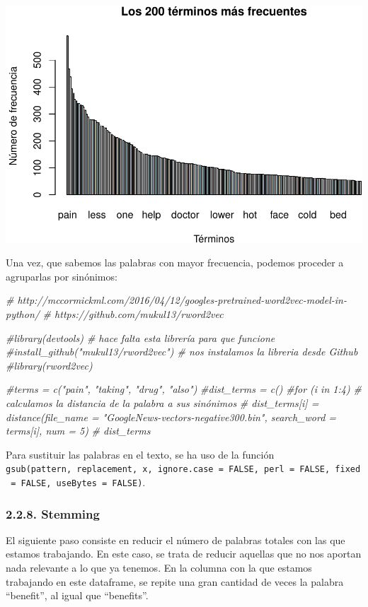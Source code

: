\documentclass[spanish,]{article}
\newenvironment{Shaded}{\begin{snugshade}}{\end{snugshade}}
\newcommand{\CommentTok}[1]{\textcolor[rgb]{0.56,0.35,0.01}{\textit{#1}}}
\begin{document}
\includegraphics{practica_files/figure-latex/unnamed-chunk-22-1.pdf}

Una vez, que sabemos las palabras con mayor frecuencia, podemos proceder
a agruparlas por sinónimos:

\begin{Shaded}
\begin{Highlighting}[]
\CommentTok{# http://mccormickml.com/2016/04/12/googles-pretrained-word2vec-model-in-python/}
\CommentTok{# https://github.com/mukul13/rword2vec}

\CommentTok{#library(devtools) # hace falta esta librería para que funcione}
\CommentTok{#install_github("mukul13/rword2vec") # nos instalamos la libreria desde Github}
\CommentTok{#library(rword2vec)}

\CommentTok{#terms = c("pain", "taking", "drug", "also")}
\CommentTok{#dist_terms = c()}
\CommentTok{#for (i in 1:4) # calculamos la distancia de la palabra a sus sinónimos}
\CommentTok{#  dist_terms[i] = distance(file_name = "GoogleNews-vectors-negative300.bin", search_word = terms[i], num = 5)}
\CommentTok{#  dist_terms}
\end{Highlighting}
\end{Shaded}

Para sustituir las palabras en el texto, se ha uso de la función
\texttt{gsub(pattern,\ replacement,\ x,\ ignore.case\ =\ FALSE,\ perl\ =\ FALSE,\ fixed\ =\ FALSE,\ useBytes\ =\ FALSE)}.

\subsubsection{2.2.8. Stemming}\label{stemming}

El siguiente paso consiste en reducir el número de palabras totales con
las que estamos trabajando. En este caso, se trata de reducir aquellas
que no nos aportan nada relevante a lo que ya tenemos. En la columna con
la que estamos trabajando en este dataframe, se repite una gran cantidad
de veces la palabra ``benefit'', al igual que ``benefits''.
\end{document}
